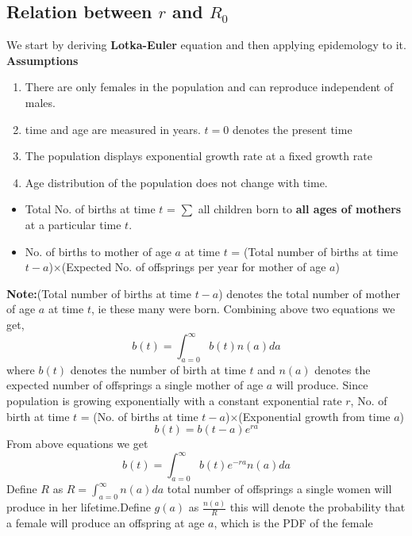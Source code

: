 \documentclass{article}
\begin{document}
\subsection{Relation between $r$ and $R_{0}$}
We start by deriving \textbf{Lotka-Euler} equation and then applying epidemology to it.\newline
\textbf{Assumptions} 
\begin{enumerate}
\item There are only females in the population and can reproduce independent of males.
\item time and age are measured in years. $t=0$ denotes the present time
\item The population displays exponential growth rate at a fixed growth rate
\item Age distribution of the population does not change with time.
\end{enumerate}
\begin{itemize}
  \item Total No. of births at time $t$ = $\sum$ all children born to
    \textbf{all ages of mothers} at a particular time $t$.
  \item No. of births to mother of age $a$ at time $t$ = (Total number of births at time $t-a$)$\times$(Expected No. of offsprings per year for mother of age $a$)
\end{itemize}
\textbf{Note:}(Total number of births at time $t-a$) denotes the total
number of mother of age $a$ at time $t$, ie these many were born. \newline
Combining above two equations we get,
$$b(t)=\int_{a=0}^{\infty}b(t)n(a)da$$ where $b(t)$ denotes the number
of birth at time $t$ and $n(a)$ denotes the expected number of offsprings a
single mother of age $a$ will produce. \newline Since population is
growing exponentially with a constant exponential rate $r$,\newline
No. of birth at time $t$ = (No. of births at time
$t-a$)$\times$(Exponential growth from time $a$)
$$b(t)=b(t-a)e^{ra}$$
From above equations we get
\begin{equation}
b(t)=\int_{a=0}^{\infty}b(t)e^{-ra}n(a)da
\end{equation}
Define $R$ as
$R=\int_{a=0}^{\infty}n(a)da$ total number of offsprings a single
women will produce in her lifetime.\newline Define $g(a)$ as
$\frac{n(a)}{R}$ this will denote the probability that a female will
produce an offspring at age $a$, which is the PDF of the female
\end{document}
